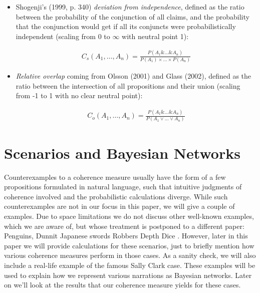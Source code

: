 \documentclass[10pt,]{scrartcl}
\begin{document}
\begin{itemize}
    \item  Shogenji's (1999, p.
340)  \textit{deviation from independence}, defined as the ratio between the probability of the
conjunction of all claims, and the probability that the conjunction
would get if all its conjuncts were probabilistically independent (scaling from 0 to $\infty$ with neutral point 1):

\begin{align}
    \tag{Shogenji}
    \label{coh:Shogenji}
    C_s(A_1,\dots,A_n)=\frac{P(A_1 \& \dots \& A_n)}{P(A_1)\times\dots\times P(A_n)}
\end{align}

\item  \textit{Relative overlap} coming from
Olsson (2001) and Glass (2002), defined as the ratio
between the intersection of all propositions and their union (scaling from -1 to 1 with no clear neutral point):

\begin{align}
    \tag{Olsson}
    \label{coh:Olsson}
    C_o(A_1,\dots,A_n)=\frac{P(A_1 \& \dots \& A_n)}{P(A_1 \vee \dots \vee A_n)}
\end{align}





    
\end{itemize}




\section{Scenarios and Bayesian Networks}\label{sec:counterexamples}


Counterexamples to a coherence measure usually have the form of a few propositions formulated in natural language, such that intuitive judgments of coherence involved and the probabilistic calculations diverge. While such counterexamples are not in our focus in this paper, we will give a couple of examples. Due to space limitations we do not discuss other well-known examples, which we are aware of, but whose treatment is postponed to a different paper: Penguins,  Dunnit
Japanese swords
Robbers
Depth
Dice
. However, later in this paper we will  provide calculations for these scenarios, just to briefly mention how various coherence measures  perform in those cases.  As a sanity check, we will also include a real-life example of the famous Sally Clark case. These examples will be used to explain how we represent various narrations as Bayesian networks. Later on we'll look at the results that  our coherence measure yields for these cases.
\end{document}
